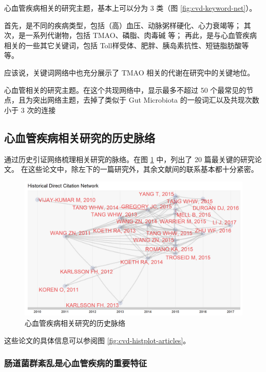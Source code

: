 \documentclass[]{ctexbook}
\begin{document}
心血管疾病相关的研究主题，基本上可以分为 3 类（图 \ref{fig:cvd-keyword-net}）。

首先，是不同的疾病类型，包括（高）血压、动脉粥样硬化、心力衰竭等；
其次，是一系列代谢物，包括 TMAO、磷脂、肉毒碱 等；
再此，是与心血管疾病相关的一些其它关键词，包括 Toll样受体、肥胖、胰岛素抗性、短链脂肪酸等等。

应该说，关键词网络中也充分展示了 TMAO 相关的代谢在研究中的关键地位。

\hypertarget{htmlwidget-2943d41cbee2eb798d27}{}

\label{fig:cvd-keyword-net}心血管相关的研究主题。在这个共现网络中，显示最多不超过 50 个最常见的节点，且为突出网络主题，去掉了类似于 Gut Microbiota 的一般词汇以及共现次数小于 3 次的连接

\hypertarget{ux5fc3ux8840ux7ba1ux75beux75c5ux76f8ux5173ux7814ux7a76ux7684ux5386ux53f2ux8109ux7edc}{%
\subsection{心血管疾病相关研究的历史脉络}\label{ux5fc3ux8840ux7ba1ux75beux75c5ux76f8ux5173ux7814ux7a76ux7684ux5386ux53f2ux8109ux7edc}}

通过历史引证网络梳理相关研究的脉络。在图 \ref{fig:cvd-histplot} 中，列出了 20 篇最关键的研究论文。
在这些论文中，除左下的一篇研究外，其余文献间的联系基本都十分紧密。

\begin{figure}
\includegraphics[width=1\linewidth]{plots/cvd-histplot-1} \caption{心血管疾病相关研究的历史脉络}\label{fig:cvd-histplot}
\end{figure}

这些论文的具体信息可以参阅图 \ref{fig:cvd-histplot-articles}。

\hypertarget{ux80a0ux9053ux83ccux7fa4ux7d0aux4e71ux662fux5fc3ux8840ux7ba1ux75beux75c5ux7684ux91cdux8981ux7279ux5f81}{%
\subsubsection{肠道菌群紊乱是心血管疾病的重要特征}\label{ux80a0ux9053ux83ccux7fa4ux7d0aux4e71ux662fux5fc3ux8840ux7ba1ux75beux75c5ux7684ux91cdux8981ux7279ux5f81}}
\end{document}
